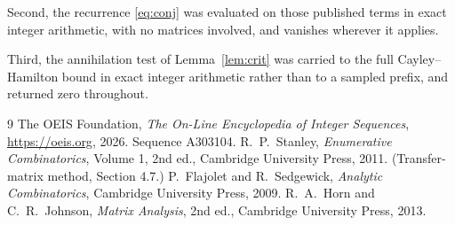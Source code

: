 \documentclass[11pt,a4paper]{article}
\theoremstyle{plain}
\theoremstyle{definition}
\begin{document}
Second, the recurrence \eqref{eq:conj} was evaluated on those published terms in exact
integer arithmetic, with no matrices involved, and vanishes wherever it applies.

Third, the annihilation test of Lemma~\ref{lem:crit} was carried to the full
Cayley--Hamilton bound in exact integer arithmetic rather than to a sampled prefix, and
returned zero throughout.

\begin{thebibliography}{9}
 The OEIS Foundation, \emph{The On-Line Encyclopedia of Integer
Sequences}, \url{https://oeis.org}, 2026. Sequence A303104.
 R.~P.~Stanley, \emph{Enumerative Combinatorics}, Volume 1, 2nd ed.,
Cambridge University Press, 2011. (Transfer-matrix method, Section 4.7.)
 P.~Flajolet and R.~Sedgewick, \emph{Analytic Combinatorics}, Cambridge
University Press, 2009.
 R.~A.~Horn and C.~R.~Johnson, \emph{Matrix Analysis}, 2nd ed., Cambridge
University Press, 2013.
\end{thebibliography}
\end{document}
